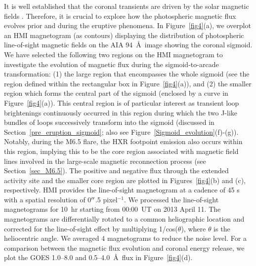 \documentclass[twocolumn]{aastex6}
\begin{document}
It is well established that the coronal transients are driven by the solar magnetic fields \citep[e.g., reviews by][]{Priest2002,Schrijver2009,Wiegelmann2014} . Therefore, it is crucial to explore how the photospheric magnetic flux evolves prior and during the eruptive phenomena. In Figure~\ref{fig4}(a), we overplot an HMI magnetogram (as contours) displaying the distribution of photospheric line-of-sight magnetic fields on the AIA 94~\AA~image showing the coronal sigmoid. We have selected the following two regions on the HMI magnetogram to investigate the evolution of magnetic flux during the sigmoid-to-arcade transformation: (1) the large region that encompasses the whole sigmoid (see the region defined within the rectangular box in Figure~\ref{fig4}(a)), and (2) the smaller region which forms the central part of the sigmoid (enclosed by a curve in Figure~\ref{fig4}(a)). This central region is of particular interest as transient loop brightenings continuously occurred in this region during which 
the two J-like bundles of loops successively transform into the sigmoid (discussed in Section~\ref{pre_eruption_sigmoid}; also see Figure~\ref{Sigmoid_evolution}(f)-(g)). Notably, during the M6.5 flare, the HXR footpoint emission also occurs within this region, implying this to be the core region associated with magnetic field lines involved in the large-scale magnetic reconnection process (see Section~\ref{sec_M6.5}).            
The positive and negative flux through the extended activity site and the smaller core region are plotted in Figures~\ref{fig4}(b) and (c), respectively. HMI provides the line-of-sight magnetogram at a cadence of 45 s with
a spatial resolution of 0$\mbox{$^{\prime\prime}$} $.5 pixel$ ^{-1}$. We processed the line-of-sight magnetograms for 10~hr starting from 00:00~UT on 2013 April 11. 
The magnetograms are differentially rotated to a common heliographic location and corrected for the line-of-sight effect by multiplying 1/cos($\theta$),
where $\theta$ is the heliocentric angle. We averaged 4 magnetograms
to reduce the noise level. For a comparison between the magnetic flux evolution and coronal energy release, we plot the GOES 1.0--8.0 and 0.5--4.0~\AA~flux in Figure~\ref{fig4}(d). 
\end{document}
